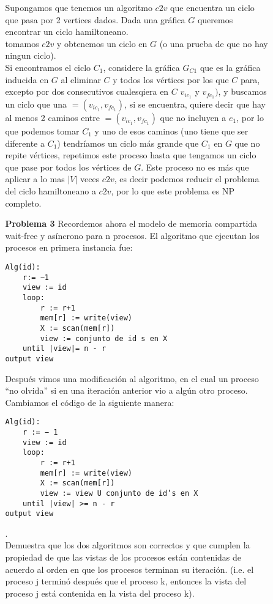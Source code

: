 \documentclass{article}
\begin{document}
\begin{enumerate}
\begin{enumerate}
\begin{enumerate}
Supongamos que tenemos un algoritmo $c2v$ que encuentra un ciclo que pasa por 2 vertices dados. Dada una gráfica $G$ queremos encontrar un ciclo hamiltoneano.\\
tomamos $c2v$ y obtenemos un ciclo en $G$ (o una prueba de que no hay ningun ciclo).\\
Si encontramos el ciclo $C_1$, considere la gráfica $G_{C1}$ que es la gráfica inducida en $G$ al eliminar $C$ y todos los vértices por los que $C$ para, excepto por dos consecutivos cualesqiera en $C$ $v_{ic_1}$ y $v_{fc_1})$, y buscamos un ciclo que una $=(v_{ic_1},v_{fc_1})$,  si se encuentra, quiere decir que hay al menos 2 caminos entre $=(v_{ic_1},v_{fc_1})$ que no incluyen a $e_1$, por lo que podemos tomar $C_1$ y uno de esos caminos (uno tiene que ser diferente a $C_1$) tendríamos un ciclo más grande que $C_1$ en $G$ que no repite vértices, repetimos este proceso hasta que tengamos un ciclo que pase por todos los vértices de $G$.
 Este proceso no es más que aplicar a lo mas $|V|$ veces $c2v$, es decir podemos reducir el problema del ciclo hamiltoneano a $c2v$, por lo que este problema es NP completo.



\item[\bf{Problema 3}] Recordemos ahora el modelo de memoria compartida wait-free y asíncrono para n procesos. El algoritmo que ejecutan los procesos en primera instancia fue:

\begin{lstlisting}[frame=single]
Alg(id):
    r:= −1
    view := id
    loop:
        r := r+1
        mem[r] := write(view)
        X := scan(mem[r])
        view := conjunto de id s en X
    until |view|= n - r
output view
\end{lstlisting}
Después vimos una modificación al algoritmo, en el cual un proceso ``no olvida'' si en una iteración anterior vio a algún otro proceso. Cambiamos el código de la siguiente manera:
\begin{lstlisting}[frame=single]
Alg(id):
    r := − 1
    view := id
    loop:
        r := r+1
        mem[r] := write(view)
        X := scan(mem[r])
        view := view U conjunto de id’s en X
    until |view| >= n - r
output view
\end{lstlisting}.\\

Demuestra que los dos algoritmos son correctos y que cumplen la propiedad de que las vistas de los procesos están contenidas de acuerdo al orden en que los procesos terminan su iteración. (i.e. el proceso j terminó después que el proceso k, entonces la vista del proceso j está contenida en la vista del proceso k).


\end{enumerate}
\end{enumerate}
\end{enumerate}
\end{document}
